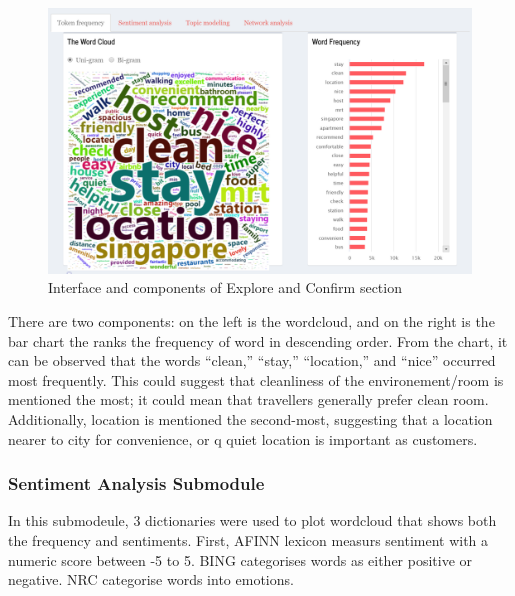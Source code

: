 \documentclass{acm_proc_article-sp}
\begin{document}
\begin{figure}[H]

{\centering \includegraphics[width=1\linewidth]{images/tokenfrequency} 

}

\caption{Interface and components of Explore and Confirm section}\label{fig:unnamed-chunk-5}
\end{figure}

There are two components: on the left is the wordcloud, and on the right
is the bar chart the ranks the frequency of word in descending order.
From the chart, it can be observed that the words ``clean,'' ``stay,''
``location,'' and ``nice'' occurred most frequently. This could suggest
that cleanliness of the environement/room is mentioned the most; it
could mean that travellers generally prefer clean room. Additionally,
location is mentioned the second-most, suggesting that a location nearer
to city for convenience, or q quiet location is important as customers.

\hypertarget{sentiment-analysis-submodule}{%
\subsubsection{Sentiment Analysis
Submodule}\label{sentiment-analysis-submodule}}

In this submodeule, 3 dictionaries were used to plot wordcloud that
shows both the frequency and sentiments. First, AFINN lexicon measurs
sentiment with a numeric score between -5 to 5. BING categorises words
as either positive or negative. NRC categorise words into emotions.
\end{document}
